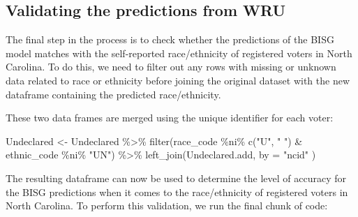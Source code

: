 \documentclass[
]{article}
\newenvironment{Shaded}{}{}
\newcommand{\AttributeTok}[1]{#1}
\newcommand{\FunctionTok}[1]{#1}
\newcommand{\NormalTok}[1]{#1}
\newcommand{\OtherTok}[1]{\textcolor[rgb]{1.00,0.25,0.00}{#1}}
\newcommand{\SpecialCharTok}[1]{\textcolor[rgb]{0.00,0.50,0.50}{#1}}
\newcommand{\StringTok}[1]{\textcolor[rgb]{0.00,0.50,0.50}{#1}}
\begin{document}
\hypertarget{validating-the-predictions-from-wru}{%
\subsection{Validating the predictions from
WRU}\label{validating-the-predictions-from-wru}}

The final step in the process is to check whether the predictions of the
BISG model matches with the self-reported race/ethnicity of registered
voters in North Carolina. To do this, we need to filter out any rows
with missing or unknown data related to race or ethnicity before joining
the original dataset with the new dataframe containing the predicted
race/ethnicity.

These two data frames are merged using the unique identifier for each
voter:

\begin{Shaded}
\begin{Highlighting}[]
\NormalTok{Undeclared }\OtherTok{\textless{}{-}}\NormalTok{ Undeclared }\SpecialCharTok{\%\textgreater{}\%} \FunctionTok{filter}\NormalTok{(race\_code }\SpecialCharTok{\%ni\%} \FunctionTok{c}\NormalTok{(}\StringTok{"U"}\NormalTok{, }\StringTok{" "}\NormalTok{) }\SpecialCharTok{\&}\NormalTok{ ethnic\_code }\SpecialCharTok{\%ni\%} \StringTok{"UN"}\NormalTok{) }\SpecialCharTok{\%\textgreater{}\%}
  \FunctionTok{left\_join}\NormalTok{(Undeclared.add, }\AttributeTok{by =} \StringTok{"ncid"}\NormalTok{ )}
\end{Highlighting}
\end{Shaded}

The resulting dataframe can now be used to determine the level of
accuracy for the BISG predictions when it comes to the race/ethnicity of
registered voters in North Carolina. To perform this validation, we run
the final chunk of code:
\end{document}
